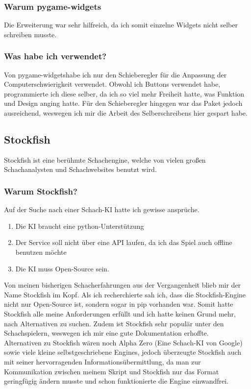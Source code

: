 \documentclass[a4paper, 10pt]{scrartcl}
\begin{document}
\subsubsection{Warum pygame-widgets}
Die Erweiterung war sehr hilfreich, da ich somit einzelne Widgets nicht selber schreiben musste.

\subsubsection{Was habe ich verwendet?}
Von \glqq pygame-widgets\grqq habe ich nur den Schieberegler für die Anpassung der Computerschwierigkeit verwendet. Obwohl ich Buttons verwendet
habe, programmierte ich diese selber, da ich so viel mehr Freiheit hatte, was Funktion und Design anging hatte. Für den Schieberegler hingegen
war das Paket jedoch ausreichend, weswegen ich mir die Arbeit des Selberschreibens hier gespart habe.

\subsection{Stockfish}
Stockfish ist eine berühmte Schachengine, welche von vielen großen Schachanalysten und Schachwebsites benutzt wird.

\subsubsection{Warum Stockfish?}
Auf der Suche nach einer Schach-KI hatte ich gewisse ansprüche.
\begin{enumerate}
        \item Die KI braucht eine python-Unterstützung
        \item Der Service soll nicht über eine API laufen, da ich das Spiel auch
        offline benutzen möchte
        \item Die KI muss Open-Source sein.
\end{enumerate}
Von meinen bisherigen Schacherfahrungen aus der Vergangenheit blieb mir
der Name Stockfish im Kopf. Als ich recherchierte sah ich, dass die 
Stockfish-Engine nicht nur Open-Source ist, sondern sogar in pip vorhanden war.
Somit hatte Stockfish alle meine Anforderungen erfüllt und ich hatte keinen Grund mehr,
nach Alternativen zu suchen.
Zudem ist Stockfish sehr populär unter den Schachspielern, weswegen ich mir eine
gute Dokumentation erhoffte.\\
Alternativen zu Stockfish wären noch Alpha Zero (Eine Schach-KI von Google)
sowie viele kleine selbstgeschriebene Engines, jedoch überzeugte Stockfish auch mit
seiner hervorragenden Informationsübermittlung, da man zur Kommunikation zwischen
meinem Skript und Stockfish nur das Format geringfügig ändern musste und schon funktionierte
die Engine einwandfrei.  
\end{document}
